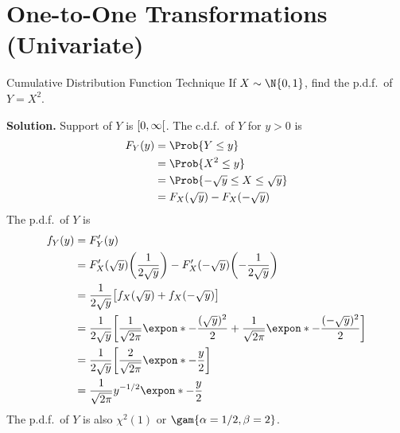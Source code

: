 \section{One-to-One Transformations (Univariate)}
\begin{Example}{Cumulative Distribution Function Technique}{}
    If $ X \sim \N{0,1} $, find the p.d.f.\ of $ Y=X^2 $.

    \textbf{Solution.} Support of $ Y $ is $ \interval[open right]{0}{\infty} $.
    The c.d.f.\ of $ Y $ for $ y>0 $ is
    \begin{align*}
        F_Y(y)
         & =\Prob{Y\le y}                     \\
         & =\Prob{X^2\le y}                   \\
         & =\Prob{-\sqrt{y}\le X\le \sqrt{y}} \\
         & =F_X(\sqrt{y})-F_X(-\sqrt{y})
    \end{align*}
    The p.d.f.\ of $ Y $ is
    \begin{align*}
        f_Y(y)
         & =F_Y^\prime(y)                                            \\
         & =F_X^\prime(\sqrt{y})\biggl( \frac{1}{2\sqrt{y}} \biggr)-
        F_X^\prime(-\sqrt{y})\biggl(-\frac{1}{2\sqrt{y}}\biggr)      \\
         & =\frac{1}{2\sqrt{y}}
        \bigl[ f_X(\sqrt{y})+f_X(-\sqrt{y})  \bigr]                  \\
         & =\frac{1}{2\sqrt{y}}
        \biggl[
            \frac{1}{\sqrt{2\pi}}\expon*{-\frac{(\sqrt{y})^2}{2}}
            +
            \frac{1}{\sqrt{2\pi}}\expon*{-\frac{(-\sqrt{y})^2}{2}}
        \biggr]                                                      \\
         & =\frac{1}{2\sqrt{y}}
        \biggl[ \frac{2}{\sqrt{2\pi}}\expon*{-\frac{y}{2}} \biggr]   \\
         & =\frac{1}{\sqrt{2\pi}}y^{-1/2}\expon*{-\frac{y}{2}}
    \end{align*}
    The p.d.f.\ of $ Y $ is also $ \chi^2(1) $ or
    $ \gam{\alpha=1/2,\beta=2} $.
\end{Example}
